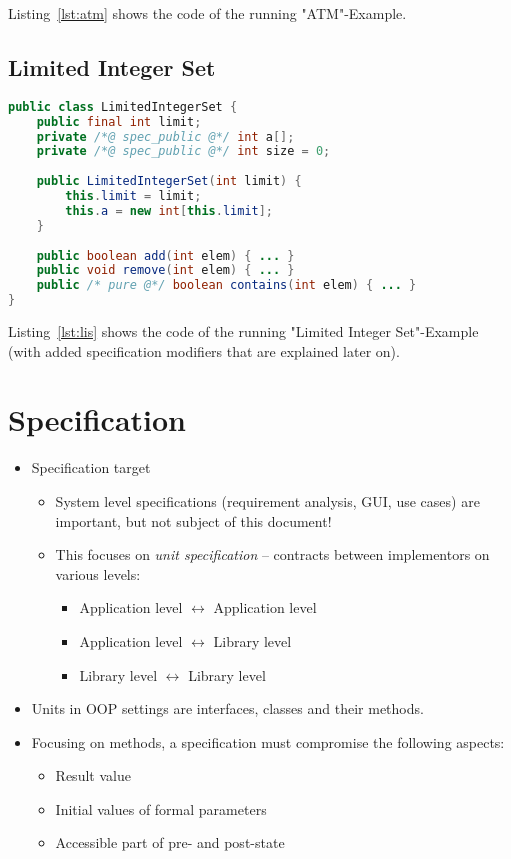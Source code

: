 \documentclass[a4paper, 11pt, accentcolor = tud3b]{tudreport}
\begin{document}
				Listing~\ref{lst:atm} shows the code of the running "ATM"-Example.

			\subsection{Limited Integer Set}
				\begin{lstlisting}[caption = { Running Example for JML 2 }, label = lst:lis, language = Java]
public class LimitedIntegerSet {
	public final int limit;
	private /*@ spec_public @*/ int a[];
	private /*@ spec_public @*/ int size = 0;
	
	public LimitedIntegerSet(int limit) {
		this.limit = limit;
		this.a = new int[this.limit];
	}
	
	public boolean add(int elem) { ... }
	public void remove(int elem) { ... }
	public /* pure @*/ boolean contains(int elem) { ... }
}
				\end{lstlisting}
				
				Listing~\ref{lst:lis} shows the code of the running "Limited Integer Set"-Example (with added specification modifiers that are explained later on).

		\section{Specification}
			\begin{itemize}
				\item Specification target
					\begin{itemize}
						\item System level specifications (requirement analysis, GUI, use cases) are important, but not subject of this document!
						\item This focuses on \textit{unit specification} -- contracts between implementors on various levels:
							\begin{itemize}
								\item Application level \(\leftrightarrow\) Application level
								\item Application level \(\leftrightarrow\) Library level
								\item Library level \(\leftrightarrow\) Library level
							\end{itemize}
					\end{itemize}
				\item Units in OOP settings are interfaces, classes and their methods.
				\item Focusing on methods, a specification must compromise the following aspects:
					\begin{itemize}
						\item Result value
						\item Initial values of formal parameters
						\item Accessible part of pre- and post-state
					\end{itemize}
			\end{itemize}
		
\end{document}
